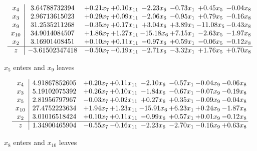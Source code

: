 \documentclass[8pt]{article}
\begin{document}
 \[\begin{array}{c| c c@{\hskip 2pt} c@{\hskip 2pt} c@{\hskip 2pt} c@{\hskip 2pt} c@{\hskip 2pt} c@{\hskip 2pt} }
 x_{4}   &  3.64788732394 & +  0.21 x_{7} & +  0.10 x_{11} & -2.23 x_{6} & -0.73 x_{1} & +  0.45 x_{5} & -0.04 x_{8}\\
 x_{3}   &  2.96713615023 & +  0.29 x_{7} & +  0.09 x_{11} & -2.06 x_{6} & -0.95 x_{1} & +  0.79 x_{5} & -0.16 x_{8}\\
 x_{9}   &  31.2535211268 & -0.35 x_{7} & +  0.17 x_{11} & +  3.04 x_{6} & +  3.89 x_{1} & -11.08 x_{5} & -0.43 x_{8}\\
 x_{10}   &  34.9014084507 & +  1.86 x_{7} & +  1.27 x_{11} & -15.18 x_{6} & +  7.15 x_{1} & -2.63 x_{5} & -1.97 x_{8}\\
 x_{2}   &  3.16901408451 & +  0.10 x_{7} & +  0.11 x_{11} & -0.97 x_{6} & +  0.59 x_{1} & -0.06 x_{5} & -0.12 x_{8}\\
\hline
z    &  -3.61502347418 & -0.50 x_{7} & -0.19 x_{11} & -2.71 x_{6} & -3.32 x_{1} & +  1.76 x_{5} & +  0.70 x_{8}\\
\end{array}\]


 $ x_{5} $ enters and $ x_{9} $ leaves 

 \[\begin{array}{c| c c@{\hskip 2pt} c@{\hskip 2pt} c@{\hskip 2pt} c@{\hskip 2pt} c@{\hskip 2pt} c@{\hskip 2pt} }
 x_{4}   &  4.91867852605 & +  0.20 x_{7} & +  0.11 x_{11} & -2.10 x_{6} & -0.57 x_{1} & -0.04 x_{9} & -0.06 x_{8}\\
 x_{3}   &  5.19102075392 & +  0.26 x_{7} & +  0.10 x_{11} & -1.84 x_{6} & -0.67 x_{1} & -0.07 x_{9} & -0.19 x_{8}\\
 x_{5}   &  2.81956797967 & -0.03 x_{7} & +  0.02 x_{11} & +  0.27 x_{6} & +  0.35 x_{1} & -0.09 x_{9} & -0.04 x_{8}\\
 x_{10}   &  27.4752223634 & +  1.94 x_{7} & +  1.23 x_{11} & -15.91 x_{6} & +  6.23 x_{1} & +  0.24 x_{9} & -1.87 x_{8}\\
 x_{2}   &  3.01016518424 & +  0.10 x_{7} & +  0.11 x_{11} & -0.99 x_{6} & +  0.57 x_{1} & +  0.01 x_{9} & -0.12 x_{8}\\
\hline
z    &  1.34900465904 & -0.55 x_{7} & -0.16 x_{11} & -2.23 x_{6} & -2.70 x_{1} & -0.16 x_{9} & +  0.63 x_{8}\\
\end{array}\]


 $ x_{8} $ enters and $ x_{10} $ leaves 
\end{document}
